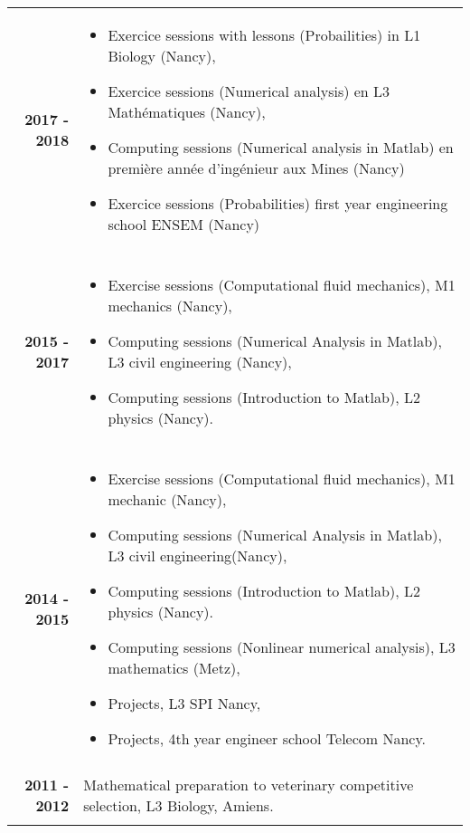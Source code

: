 \documentclass[10pt,a4paper]{report}
\begin{document}
\vspace{0.4cm}
\noindent
\begin{center}
\begin{tabular}{r p{12cm}}
\textbf{2017 - 2018} & \begin{itemize}
\item Exercice sessions with lessons (Probailities) in L1 Biology (Nancy),
\item Exercice sessions (Numerical analysis) en L3 Mathématiques (Nancy),
\item Computing sessions (Numerical analysis in Matlab) en première année d'ingénieur aux Mines (Nancy)
\item Exercice sessions (Probabilities) first year engineering school ENSEM (Nancy)
\end{itemize}\\

& \\

\textbf{2015 - 2017} & \begin{itemize}
\item Exercise sessions (Computational fluid mechanics), M1 mechanics (Nancy),
\item Computing sessions (Numerical Analysis in Matlab), L3 civil engineering (Nancy),
\item Computing sessions (Introduction to Matlab), L2 physics (Nancy).
\end{itemize}\\

& \\

\textbf{2014 - 2015} & \begin{itemize}
\item Exercise sessions (Computational fluid mechanics), M1 mechanic (Nancy),
\item Computing sessions (Numerical Analysis in Matlab), L3 civil engineering(Nancy),
\item Computing sessions (Introduction to Matlab), L2 physics (Nancy).
\item Computing sessions (Nonlinear numerical analysis), L3 mathematics (Metz),
\item Projects, L3 SPI Nancy,
\item Projects, 4th year engineer school Telecom Nancy.
\end{itemize}\\

& \\

\textbf{2011 - 2012} & Mathematical preparation to veterinary competitive selection, L3 Biology, Amiens.\\

& \\
\end{tabular}
\end{center}
\end{document}

